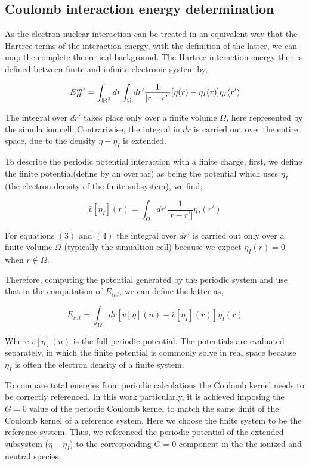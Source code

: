 \documentclass[12pt,a4paper]{article}
\begin{document}
\subsection{Coulomb interaction energy determination}

As the electron-nuclear interaction can be treated in an equivalent way that the Hartree terms of the interaction energy, with the definition of
the latter, we can map the complete theoretical background. The Hartree interaction energy then is defined between finite and infinite
electronic system by,

\begin{equation}
	E^{int}_H = \int_{{\rm I\!R}^3} dr \int_{\Omega} dr' \frac{1}{|r-r'|} [\eta(r)-\eta_{I}(r)]\eta_{I}(r') 
\end{equation}

The integral over $dr'$ takes place only over a finite volume $\Omega$, here represented by the simulation cell. Contrariwise, the integral in $dr$
is carried out over the entire space, due to the density $\eta -\eta_{I}$ is extended.

To describe the periodic potential interaction with a finite charge, first, we define the finite potential(define by an overbar) as being the potential which uses $\eta_{I}$ (the electron density of the finite subsystem), we find,

\begin{equation}
	\bar{v} [\eta_I](r) = \int_{\Omega} dr' \frac{1}{|r-r'|} \eta_{I}(r')
\end{equation}

For equations $(3)$ and $(4)$ the integral over $dr'$ is carried out only over a finite volume $\Omega$ (typically the simualtion cell) because we 
expect $\eta_{I}(r)=0$ when $r \not\in \Omega$. 

Therefore, computing the potential generated by the periodic system and use that in the computation of $E_{int}$, we can define the latter as,

\begin{equation}
	E_{int} = \int_{\Omega} dr [v[\eta](n)-\bar{v}[\eta_{I}](r)]\eta_{I}(r)
\end{equation}

Where $v[\eta](n)$ is the full periodic potential. The potentials are evaluated separately, in which the finite potential is commonly solve in real 
space because $\eta_{I}$ is often the electron density of a finite system. 

To compare total energies from periodic calculations the Coulomb kernel needs to be correctly referenced. In this work particularly, it is achieved 
imposing the $G=0$ value of the periodic Coulomb kernel to match the same limit of the Coulomb kernel of a reference system. Here we choose the
finite system to be the reference system. Thus, we referenced the periodic potential of the extended subsystem ($\eta -\eta_{I}$) to the corresponding
$G=0$ component in the the ionized and neutral species. 
\end{document}
